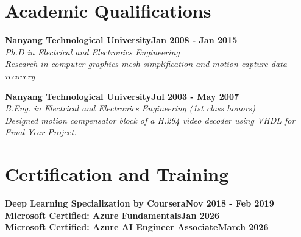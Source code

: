 \documentclass[a4paper,11pt]{article}
\newcommand{\heading}[2]{
	\hspace{10pt}#1\hfill#2\\
}
\newcommand{\headingBf}[2]{
	\heading{\textbf{#1}}{\textbf{#2}}
}
\newcommand{\headingIt}[2]{
	\heading{\textit{#1}}{\textit{#2}}
}
\begin{document}
	\section{Academic Qualifications}
	
	\headingBf{Nanyang Technological University}{Jan 2008 - Jan 2015} %
	\headingIt{Ph.D in Electrical and Electronics Engineering}{}
	\headingIt{Research in computer graphics mesh simplification and motion capture data recovery}{}
	\vspace{5pt}

	\headingBf{Nanyang Technological University}{Jul 2003 - May 2007} %
	\headingIt{B.Eng. in Electrical and Electronics Engineering (1st class honors)}{}
	\headingIt{Designed motion compensator block of a H.264 video decoder using VHDL for Final Year Project.}{}
	
	\section{Certification and Training}
	\headingBf{Deep Learning Specialization by Coursera}{Nov 2018 - Feb 2019}
	\headingBf{Microsoft Certified: Azure Fundamentals}{Jan 2026}
	\headingBf{Microsoft Certified: Azure AI Engineer Associate}{March 2026}

	
	


	
\end{document}

